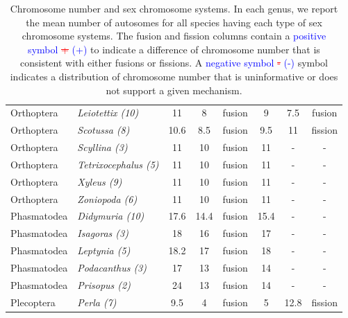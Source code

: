 \documentclass[]{rsos}%
\begin{document}
\begin{table}[h!]
\begin{tabular}{llcccccc}
Orthoptera  & \textit{Leiotettix (10)}     & 11   & 8    & fusion & 9    & 7.5   & fusion  \\
Orthoptera  & \textit{Scotussa (8)}        & 10.6 & 8.5  & fusion & 9.5  & 11    & fission \\
Orthoptera  & \textit{Scyllina (3)}        & 11   & 10   & fusion & 11   & -     & -       \\
Orthoptera  & \textit{Tetrixocephalus (5)} & 11   & 10   & fusion & 11   & -     & -       \\
Orthoptera  & \textit{Xyleus (9)}          & 11   & 10   & fusion & 11   & -     & -       \\
Orthoptera  & \textit{Zoniopoda (6)}       & 11   & 10   & fusion & 11   & -     & -       \\
Phasmatodea & \textit{Didymuria (10)}      & 17.6 & 14.4 & fusion & 15.4 & -     & -       \\
Phasmatodea & \textit{Isagoras (3)}        & 18   & 16   & fusion & 17   & -     & -       \\
Phasmatodea & \textit{Leptynia (5)}        & 18.2 & 17   & fusion & 18   & -     & -       \\
Phasmatodea & \textit{Podacanthus (3)}     & 17   & 13   & fusion & 14   & -     & -       \\
Phasmatodea & \textit{Prisopus (2)}        & 24   & 13   & fusion & 14   & -     & -       \\
Plecoptera  & \textit{Perla (7)}           & 9.5  & 4    & fusion & 5    & 12.8  & fission \\ \hline
\end{tabular}
\caption{Chromosome number and sex chromosome systems. In each genus, we report the mean number of autosomes for all species having each type of sex chromosome systems. The fusion and fission columns contain a
\textcolor{blue}{positive symbol} \textcolor{red}{\st{+}} \textcolor{blue}{(+)} to indicate a difference of chromosome number that is consistent with either fusions or fissions. A \textcolor{blue}{negative symbol} \textcolor{red}{\st{-}} \textcolor{blue}{(-)} symbol indicates a distribution of chromosome number that is uninformative or does not support a given mechanism.}
\label{tab:fusions}
\end{table}

\vspace*{-10pt}

\noindent 

\end{document}
